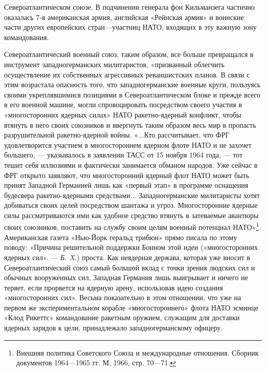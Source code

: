 \documentclass[12pt, a4paper, openany]{book}
\begin{document}
Североатлантическом союзе. В подчинении генерала фон Кильманзега частично оказалась 7-я американская армия, английская «Рейнская армия» и воинские части других европейских стран—участниц НАТО, входящих в эту важную зону командования.
	
	Североатлантический военный союз, таким образом, все больше превращался в инструмент западногерманских милитаристов, «призванный облегчить осуществление их собственных агрессивных реваншистских планов. В связи с этим возрастала опасность того, что западногерманские военные круги, пользуясь своими укреплявшимися позициями в Североатлантическом блоке и прежде всего в его военной машине, могли спровоцировать посредством своего участия в «многосторонних ядерных силах» НАТО ракетно-ядерный конфликт, чтобы втянуть в него своих союзников и ввергнуть таким образом весь мир в пропасть разрушительной ракетно-ядерной войны. «...Кто рассчитывает, что ФРГ удовлетворится участием в многостороннем ядерном флоте НАТО и не захочет большего, — указывалось в заявлении ТАСС от 15 ноября 1964 года, — тот тешит себя иллюзиями и фактически занимается обманом народов. Уже сейчас в ФРГ открыто заявляют, что многосторонний ядерный флот НАТО может быть принят Западной Германией лишь как «первый этап» в программе оснащения будесвера ракетно-ядерными средствами... Западногерманские милитаристы хотят добиваться своих целей посредством шантажа и угроз. Многосторонние ядерные силы рассматриваются ими как удобное средство втянуть в затеваемые авантюры своих союзников, поставить на службу своим целям военный потенциал НАТО»{\footnote{Внешняя политика Советского Союза и международные отношения. Сборник документов 1964—1965 гг. М, 1966, стр. 70—71.}}. Американская газета «Нью-Йорк геральд трибюн» прямо писала по этому поводу: «Причина решительной поддержки Бонном этой идеи («многосторонних ядерных сил». — \textit{Б. X.}) проста. Как неядерная держава, которая уже вносит в Североатлантический союз самый большой вклад с точки зрения людских сил и обычных вооруженных сил, Западная Германия лишь выигрывает и ничего не теряет, если прорвется на ядерную арену, использовав идею создания «многосторонних сил». Весьма показательно в этом отношении, что уже на первом же экспериментальном корабле «многостороннего» флота НАТО эсминце «Клод Рикеттс» командование ракетным оружием, служащим для доставки ядерных зарядов к цели, принадлежало западногерманскому офицеру.
	
	
	
\end{document}
